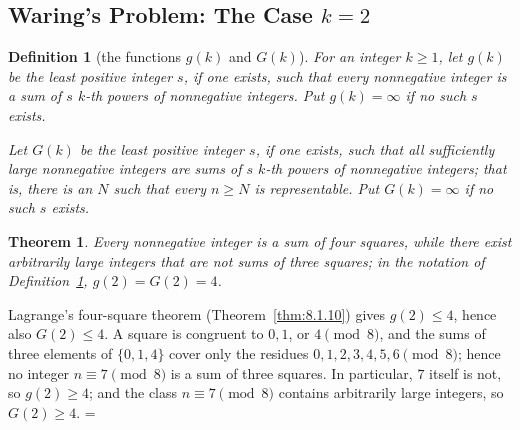 \documentclass[11pt]{article}
\makeatletter
\let\nt@closedisplay\]
\def\nt@guardedclose{\@ifnextchar\par{\nt@closeafterpar}{\@ifnextchar\end{\postdisplaypenalty\@M\nt@closedisplay}{\nt@closedisplay}}}
\def\nt@closeafterpar\par{\@ifnextchar\par{\nt@closeafterpar}{\@ifnextchar\end{\postdisplaypenalty\@M\nt@closedisplay\par}{\nt@closedisplay\par}}}
\renewenvironment{proof}[1][\proofname]{\par
  \pushQED{\qed}\normalfont\topsep\medskipamount\edef\nt@afterproof{\@endparpenalty=\the\@endparpenalty\relax}\@beginparpenalty\@M\@endparpenalty\@M\let\]\nt@guardedclose\trivlist\item[]\textit{#1\@addpunct{.}} \ignorespaces}{\ifvmode\addpenalty\@M\fi\popQED\nt@afterproof\endtrivlist\@endpefalse}
\theoremstyle{ntstyle}
\newtheorem{theorem}{Theorem}[subsection]
\newtheorem{definition}{Definition}[subsection]
\makeatother
\begin{document}
\subsection{Waring's Problem: The Case \texorpdfstring{$k=2$}{k=2}}

\begin{definition}[the functions $g(k)$ and $G(k)$]\label{def:12.6.1}\label{def:the-functions-g-k-and-g-k}
  For an integer $k\ge1$,
  let $g(k)$ be the least positive integer $s$, if one exists, such that
  every nonnegative integer is a sum of $s$ $k$-th powers of
  nonnegative integers. Put $g(k)=\infty$ if no such $s$ exists.

  Let $G(k)$ be the least positive integer $s$, if one exists, such that
  all sufficiently large nonnegative integers are sums of $s$ $k$-th
  powers of nonnegative integers; that is, there is an $N$ such that every
  $n\ge N$ is representable. Put $G(k)=\infty$ if no such $s$ exists.

\end{definition}

\begin{theorem}\label{thm:12.6.1} Every nonnegative integer is a
  sum of four squares, while there exist arbitrarily large integers
  that are not sums of three squares; in the notation of Definition~\ref{def:12.6.1}, $g(2) = G(2) = 4$.

\end{theorem}

\begin{proof} Lagrange's four-square theorem (Theorem~\ref{thm:8.1.10}) gives $g(2)\le4$, hence also $G(2)\le4$. A square
  is congruent to $0, 1$, or $4\pmod{8}$, and the sums of three
  elements of $\{0, 1, 4\}$ cover only the residues $0, 1, 2, 3, 4, 5, 6\pmod{8}$; hence no integer
  $n\equiv7\pmod{8}$ is a sum of three
  squares. In particular, $7$ itself is not, so $g(2)\ge4$; and the
  class $n\equiv7\pmod{8}$ contains arbitrarily large integers, so
  $G(2)\ge4$.
\end{proof}


\clearpage
{}
{}
\printindex
\end{document}
